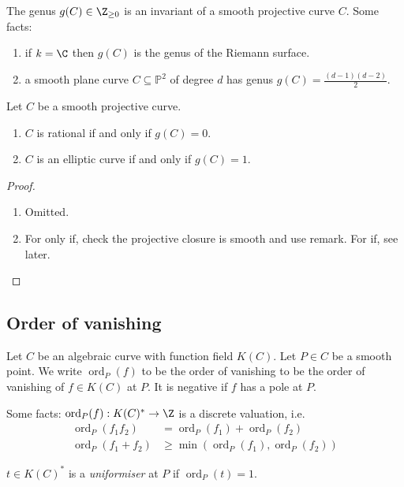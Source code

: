 \documentclass[a4paper]{article}
\theoremstyle{definition}
\theoremstyle{theorem}
\renewcommand*{\P}{\mathbb{P}}
\DeclareMathOperator{\ord}{ord}
\begin{document}
\begin{remark}
  The genus \(g(C) \in \Z_{\geq 0}\) is an invariant of a smooth projective curve \(C\). Some facts:
  \begin{enumerate}
  \item if \(k = \C\) then \(g(C)\) is the genus of the Riemann surface.
  \item a smooth plane curve \(C \subseteq \P^2\) of degree \(d\) has genus \(g(C) = \frac{(d - 1)(d - 2)}{2}\).
  \end{enumerate}
\end{remark}

\begin{proposition}
  Let \(C\) be a smooth projective curve.
  \begin{enumerate}
  \item \(C\) is rational if and only if \(g(C) = 0\).
  \item \(C\) is an elliptic curve if and only if \(g(C) = 1\).
  \end{enumerate}
\end{proposition}

\begin{proof}\leavevmode
  \begin{enumerate}
  \item Omitted.
  \item For only if, check the projective closure is smooth and use remark. For if, see later.
  \end{enumerate}
\end{proof}

\subsection{Order of vanishing}

Let \(C\) be an algebraic curve with function field \(K(C)\). Let \(P \in C\) be a smooth point. We write \(\ord_P(f)\) to be the order of vanishing to be the order of vanishing of \(f \in K(C)\) at \(P\). It is negative if \(f\) has a pole at \(P\).

Some facts: \(\ord_P(f): K(C)^* \to \Z\) is a discrete valuation, i.e.
\begin{align*}
  \ord_P(f_1f_2) &= \ord_P(f_1) + \ord_P(f_2) \\
  \ord_P(f_1 + f_2) & \geq \min(\ord_P(f_1), \ord_P(f_2))
\end{align*}

\begin{definition}[uniformiser]
  \(t \in K(C)^*\) is a \emph{uniformiser} at \(P\) if \(\ord_P(t) = 1\).
\end{definition}
\end{document}
